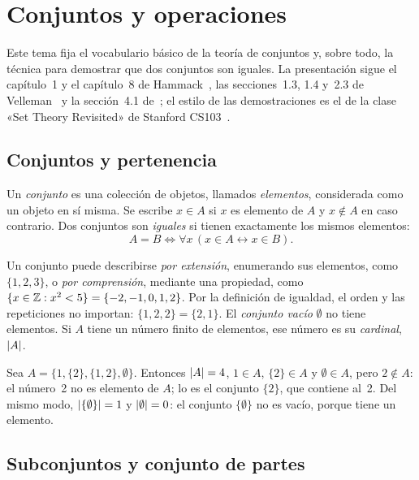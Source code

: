 \chapter{Conjuntos y operaciones}
\label{tema:1}

Este tema fija el vocabulario básico de la teoría de conjuntos y, sobre todo, la técnica para demostrar que dos conjuntos son iguales. La presentación sigue el capítulo~1 y el capítulo~8 de Hammack~\cite{hammack}, las secciones~1.3, 1.4 y~2.3 de Velleman~\cite{velleman} y la sección~4.1 de~\cite{mcs}; el estilo de las demostraciones es el de la clase «Set Theory Revisited» de Stanford CS103~\cite{cs103set}.

\section{Conjuntos y pertenencia}

\begin{definicion}[Conjunto]
Un \emph{conjunto} es una colección de objetos, llamados \emph{elementos}, considerada como un objeto en sí misma. Se escribe $x\in A$ si $x$ es elemento de $A$ y $x\notin A$ en caso contrario. Dos conjuntos son \emph{iguales} si tienen exactamente los mismos elementos:
\[
A=B\iff \forall x\,(x\in A\leftrightarrow x\in B).
\]
\end{definicion}

Un conjunto puede describirse \emph{por extensión}, enumerando sus elementos, como $\{1,2,3\}$, o \emph{por comprensión}, mediante una propiedad, como $\{x\in\mathbb{Z} : x^{2}<5\}=\{-2,-1,0,1,2\}$. Por la definición de igualdad, el orden y las repeticiones no importan: $\{1,2,2\}=\{2,1\}$. El \emph{conjunto vacío} $\emptyset$ no tiene elementos. Si $A$ tiene un número finito de elementos, ese número es su \emph{cardinal}, $\lvert A\rvert$.

\begin{ejemplo}\label{ej:t1-pertenencia}
Sea $A=\{1,\{2\},\{1,2\},\emptyset\}$. Entonces $\lvert A\rvert=4$, $1\in A$, $\{2\}\in A$ y $\emptyset\in A$, pero $2\notin A$: el número~2 no es elemento de $A$; lo es el conjunto $\{2\}$, que contiene al~2. Del mismo modo, $\lvert\{\emptyset\}\rvert=1$ y $\lvert\emptyset\rvert=0$: el conjunto $\{\emptyset\}$ no es vacío, porque tiene un elemento.
\end{ejemplo}

\section{Subconjuntos y conjunto de partes}

